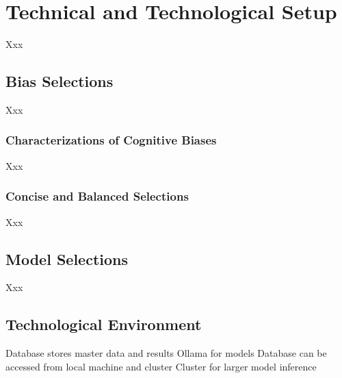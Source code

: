 \section{Technical and Technological Setup}
Xxx

\subsection{Bias Selections}
Xxx

\subsubsection{Characterizations of Cognitive Biases}
Xxx

\subsubsection{Concise and Balanced Selections}
Xxx

\subsection{Model Selections}
Xxx

\subsection{Technological Environment}
Database stores master data and results
Ollama for models
Database can be accessed from local machine and cluster
Cluster for larger model inference